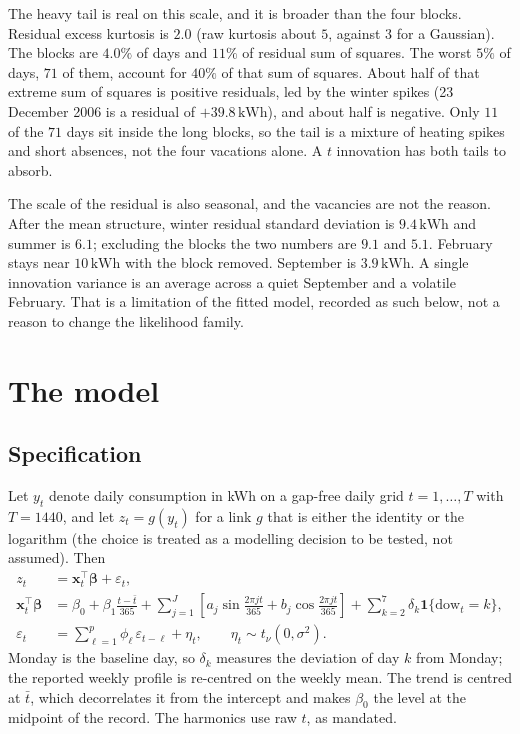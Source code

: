\documentclass[11pt]{article}
\newcommand{\kwh}{\,\mathrm{kWh}}
\begin{document}
The heavy tail is real on this scale, and it is broader than the four blocks.
Residual excess kurtosis is $2.0$ (raw kurtosis about $5$, against $3$ for a
Gaussian). The blocks are $4.0\%$ of days and $11\%$ of residual sum of
squares. The worst $5\%$ of days, $71$ of them, account for $40\%$ of that
sum of squares. About half of that extreme sum of squares is positive
residuals, led by the winter spikes (23 December 2006 is a residual of
$+39.8\kwh$), and about half is negative. Only $11$ of the $71$ days sit inside
the long blocks, so the tail is a mixture of heating spikes and short
absences, not the four vacations alone. A $t$ innovation has both tails to
absorb.

The scale of the residual is also seasonal, and the vacancies are not the
reason. After the mean structure, winter residual standard deviation is
$9.4\kwh$ and summer is $6.1$; excluding the blocks the two numbers are
$9.1$ and $5.1$. February stays near $10\kwh$ with the block removed.
September is $3.9\kwh$. A single innovation variance is an average across a
quiet September and a volatile February. That is a limitation of the fitted
model, recorded as such below, not a reason to change the likelihood family.

\section{The model}

\subsection{Specification}

Let $y_t$ denote daily consumption in kWh on a gap-free daily grid
$t = 1,\dots,T$ with $T = 1440$, and let $z_t = g(y_t)$ for a link $g$ that is
either the identity or the logarithm (the choice is treated as a modelling
decision to be tested, not assumed). Then
\begin{align}
z_t &= \mathbf{x}_t^{\top}\boldsymbol\beta + \varepsilon_t, \label{eq:mean}\\
\mathbf{x}_t^{\top}\boldsymbol\beta
 &= \beta_0
  + \beta_1 \frac{t - \bar t}{365}
  + \sum_{j=1}^{J}\left[a_j \sin\frac{2\pi j t}{365} + b_j \cos\frac{2\pi j t}{365}\right]
  + \sum_{k=2}^{7}\delta_k \mathbf{1}\{\mathrm{dow}_t = k\}, \label{eq:design}\\
\varepsilon_t &= \sum_{\ell=1}^{p}\phi_\ell\,\varepsilon_{t-\ell} + \eta_t,
\qquad
\eta_t \sim t_\nu(0,\sigma^2). \label{eq:ar}
\end{align}
Monday is the baseline day, so $\delta_k$ measures the deviation of day $k$
from Monday; the reported weekly profile is re-centred on the weekly mean.
The trend is centred at $\bar t$, which decorrelates it from the intercept and
makes $\beta_0$ the level at the midpoint of the record. The harmonics use
raw $t$, as mandated.
\end{document}
